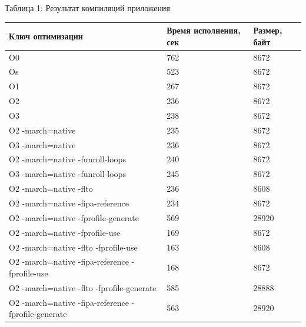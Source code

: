 \documentclass[12pt,a4paper]{scrartcl}
\begin{document}
\newpage
\begin{center}
\caption{Таблица 1: Результат компиляций приложения}
\begin{tabular}{| l | l | l |}
\hline
Ключ оптимизации & Время исполнения, сек & Размер, байт  \\ \hline
O0 & 762 & 8672\\
Os & 523 & 8672\\
O1 & 267 & 8672\\
O2 & 236 & 8672\\
O3 & 238 & 8672\\
O2 -march=native&	235&	8672\\
O3 -march=native &	236	&8672\\
O2 -march=native -funroll-loops&	240	&8672\\
O3 -march=native -funroll-loops&	245	&8672\\
O2 -march=native -flto&	236	&8608\\
O2 -march=native -fipa-reference&	234	&8672\\
O2 -march=native -fprofile-generate& 569	&28920\\
O2 -march=native -fprofile-use&	169	&8672\\
O2 -march=native -flto -fprofile-use&	163	&8608\\
O2 -march=native -fipa-reference -fprofile-use&	168	&8672\\
O2 -march=native -flto -fprofile-generate	&585	&28888\\
O2 -march=native -fipa-reference -fprofile-generate & 563 &	28920\\
\hline
\end{tabular}\\


\end{center}
\end{document}
